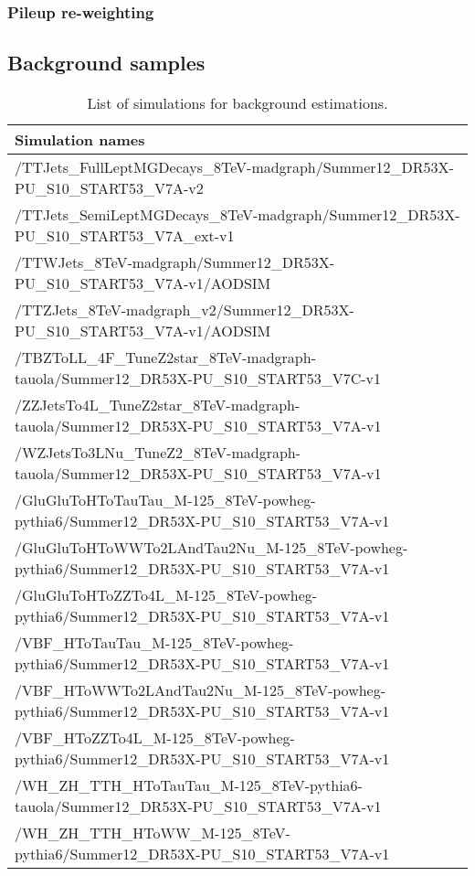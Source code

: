 \subsubsection*{Pileup re-weighting}


\subsection{Background samples}


\begin{table*}[!hbtp]
\small
\centering
\caption{List of simulations for background estimations.}
\label{tab:TableMCNames}
\begin{tabular}{l}
\hline \hline
Simulation names \\
\hline
/TTJets\_FullLeptMGDecays\_8TeV-madgraph/Summer12\_DR53X-PU\_S10\_START53\_V7A-v2 \\
/TTJets\_SemiLeptMGDecays\_8TeV-madgraph/Summer12\_DR53X-PU\_S10\_START53\_V7A\_ext-v1 \\ 
/TTWJets\_8TeV-madgraph/Summer12\_DR53X-PU\_S10\_START53\_V7A-v1/AODSIM \\ 
/TTZJets\_8TeV-madgraph\_v2/Summer12\_DR53X-PU\_S10\_START53\_V7A-v1/AODSIM \\
/TBZToLL\_4F\_TuneZ2star\_8TeV-madgraph-tauola/Summer12\_DR53X-PU\_S10\_START53\_V7C-v1 \\
/ZZJetsTo4L\_TuneZ2star\_8TeV-madgraph-tauola/Summer12\_DR53X-PU\_S10\_START53\_V7A-v1 \\
/WZJetsTo3LNu\_TuneZ2\_8TeV-madgraph-tauola/Summer12\_DR53X-PU\_S10\_START53\_V7A-v1 \\
/GluGluToHToTauTau\_M-125\_8TeV-powheg-pythia6/Summer12\_DR53X-PU\_S10\_START53\_V7A-v1 \\
\footnotesize /GluGluToHToWWTo2LAndTau2Nu\_M-125\_8TeV-powheg-pythia6/Summer12\_DR53X-PU\_S10\_START53\_V7A-v1 \\
/GluGluToHToZZTo4L\_M-125\_8TeV-powheg-pythia6/Summer12\_DR53X-PU\_S10\_START53\_V7A-v1 \\
/VBF\_HToTauTau\_M-125\_8TeV-powheg-pythia6/Summer12\_DR53X-PU\_S10\_START53\_V7A-v1 \\
\footnotesize /VBF\_HToWWTo2LAndTau2Nu\_M-125\_8TeV-powheg-pythia6/Summer12\_DR53X-PU\_S10\_START53\_V7A-v1 \\
/VBF\_HToZZTo4L\_M-125\_8TeV-powheg-pythia6/Summer12\_DR53X-PU\_S10\_START53\_V7A-v1 \\
/WH\_ZH\_TTH\_HToTauTau\_M-125\_8TeV-pythia6-tauola/Summer12\_DR53X-PU\_S10\_START53\_V7A-v1 \\
/WH\_ZH\_TTH\_HToWW\_M-125\_8TeV-pythia6/Summer12\_DR53X-PU\_S10\_START53\_V7A-v1 \\
\hline \hline
\end{tabular}
\end{table*}


